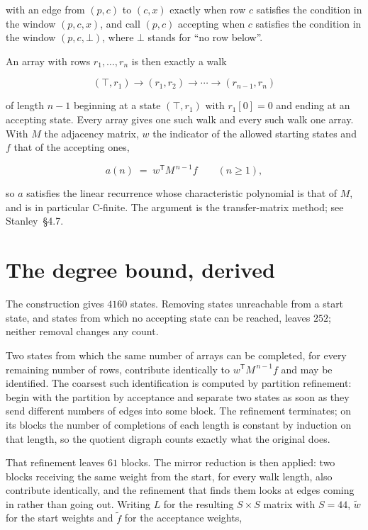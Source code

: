 \documentclass[11pt]{article}
\theoremstyle{definition}
\begin{document}
with an edge from $(p,c)$ to $(c,x)$ exactly when row $c$ satisfies the condition in the window $(p,c,x)$, and call $(p,c)$ accepting when $c$ satisfies the condition in the window $(p,c,\bot)$, where $\bot$ stands for ``no row below''.

An array with rows $r_1,\dots,r_n$ is then exactly a walk

\[(\top,r_1) \to (r_1,r_2) \to \cdots \to (r_{n-1},r_n)\]

of length $n-1$ beginning at a state $(\top,r_1)$ with $r_1[0]=0$ and ending at an accepting state. Every array gives one such walk and every such walk one array. With $M$ the adjacency matrix, $w$ the indicator of the allowed starting states and $f$ that of the accepting ones,

\[a(n) \;=\; w^{\mathsf T} M^{\,n-1} f \qquad (n \ge 1),\]

so $a$ satisfies the linear recurrence whose characteristic polynomial is that of $M$, and is in particular C-finite. The argument is the transfer-matrix method; see Stanley~\S4.7.

\section{The degree bound, derived}

The construction gives $4160$ states. Removing states unreachable from a start state, and states from which no accepting state can be reached, leaves $252$; neither removal changes any count.

Two states from which the same number of arrays can be completed, for every remaining number of rows, contribute identically to $w^{\mathsf T}M^{\,n-1}f$ and may be identified. The coarsest such identification is computed by partition refinement: begin with the partition by acceptance and separate two states as soon as they send different numbers of edges into some block. The refinement terminates; on its blocks the number of completions of each length is constant by induction on that length, so the quotient digraph counts exactly what the original does.

That refinement leaves $61$ blocks. The mirror reduction is then applied: two blocks receiving the same weight from the start, for every walk length, also contribute identically, and the refinement that finds them looks at edges coming in rather than going out. Writing $L$ for the resulting $S \times S$ matrix with $S = 44$, $\tilde w$ for the start weights and $\tilde f$ for the acceptance weights,
\end{document}
